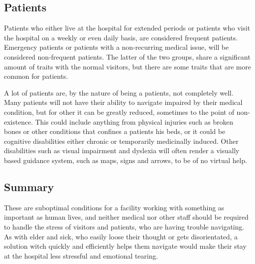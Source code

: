 \subsection{Patients}

Patients who either live at the hospital for extended periods or patients who visit the hospital on a weekly or even daily basis, are considered frequent patients. Emergency patients or patients with a non-recurring medical issue, will be considered non-frequent patients. The latter of the two groups, share a significant amount of traits with the normal visitors, but there are some traits that are more common for patients.

A lot of patients are, by the nature of being a patients, not completely well. Many patients will not have their ability to navigate impaired by their medical condition, but for other it can be greatly reduced, sometimes to the point of non-existence. This could include anything from physical injuries such as broken bones or other conditions that confines a patients his beds, or it could be cognitive disabilities either chronic or temporarily medicinally induced. Other disabilities such as visual impairment and dyslexia will often render a visually based guidance system, such as maps, signs and arrows, to be of no virtual help.\cite{visual_impairment}


\subsection{Summary}

These are suboptimal conditions for a facility working with something as important as human lives, and neither medical nor other staff should be required to handle the stress of visitors and patients, who are having trouble navigating. As with elder and sick, who easily loose their thought or gets disorientated, a solution witch quickly and efficiently helps them navigate would make their stay at the hospital less stressful and emotional tearing.